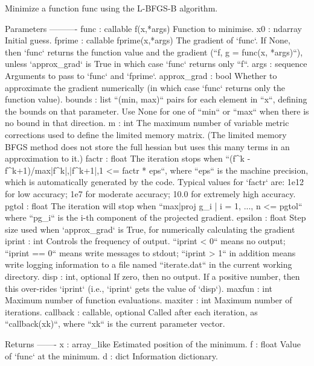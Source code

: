 \begin{DoxyVerb}Minimize a function func using the L-BFGS-B algorithm.

Parameters
----------
func : callable f(x,*args)
    Function to minimise.
x0 : ndarray
    Initial guess.
fprime : callable fprime(x,*args)
    The gradient of `func`.  If None, then `func` returns the function
    value and the gradient (``f, g = func(x, *args)``), unless
    `approx_grad` is True in which case `func` returns only ``f``.
args : sequence
    Arguments to pass to `func` and `fprime`.
approx_grad : bool
    Whether to approximate the gradient numerically (in which case
    `func` returns only the function value).
bounds : list
    ``(min, max)`` pairs for each element in ``x``, defining
    the bounds on that parameter. Use None for one of ``min`` or
    ``max`` when there is no bound in that direction.
m : int
    The maximum number of variable metric corrections
    used to define the limited memory matrix. (The limited memory BFGS
    method does not store the full hessian but uses this many terms in an
    approximation to it.)
factr : float
    The iteration stops when
    ``(f^k - f^{k+1})/max{|f^k|,|f^{k+1}|,1} <= factr * eps``,
    where ``eps`` is the machine precision, which is automatically
    generated by the code. Typical values for `factr` are: 1e12 for
    low accuracy; 1e7 for moderate accuracy; 10.0 for extremely
    high accuracy.
pgtol : float
    The iteration will stop when
    ``max{|proj g_i | i = 1, ..., n} <= pgtol``
    where ``pg_i`` is the i-th component of the projected gradient.
epsilon : float
    Step size used when `approx_grad` is True, for numerically
    calculating the gradient
iprint : int
    Controls the frequency of output. ``iprint < 0`` means no output;
    ``iprint == 0`` means write messages to stdout; ``iprint > 1`` in
    addition means write logging information to a file named
    ``iterate.dat`` in the current working directory.
disp : int, optional
    If zero, then no output.  If a positive number, then this over-rides
    `iprint` (i.e., `iprint` gets the value of `disp`).
maxfun : int
    Maximum number of function evaluations.
maxiter : int
    Maximum number of iterations.
callback : callable, optional
    Called after each iteration, as ``callback(xk)``, where ``xk`` is the
    current parameter vector.

Returns
-------
x : array_like
    Estimated position of the minimum.
f : float
    Value of `func` at the minimum.
d : dict
    Information dictionary.


\end{DoxyVerb}
